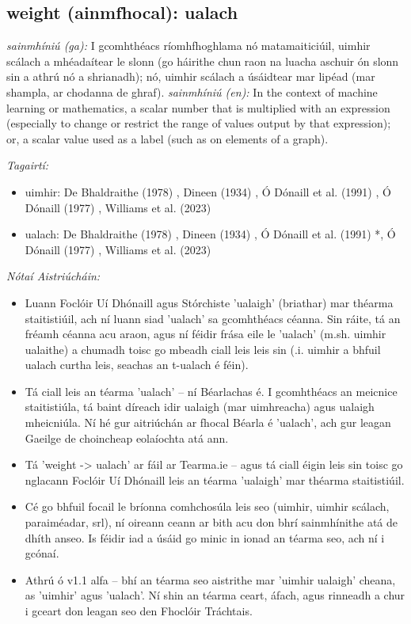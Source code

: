 \documentclass{article}
\begin{document}
\subsection*{weight (ainmfhocal): ualach} 
 \noindent \textit{sainmhíniú (ga):} I gcomhthéacs ríomhfhoghlama nó matamaiticiúil, uimhir scálach a mhéadaítear le slonn (go háirithe chun raon na luacha aschuir ón slonn sin a athrú nó a shrianadh); nó, uimhir scálach a úsáidtear mar lipéad (mar shampla, ar chodanna de ghraf).
\newline\newline
 \noindent \textit{sainmhíniú (en):} In the context of machine learning or mathematics, a scalar number that is multiplied with an expression (especially to change or restrict the range of values output by that expression); or, a scalar value used as a label (such as on elements of a graph).
\newline

 \noindent \textit{Tagairtí:}
\begin{itemize}
	\item uimhir: De Bhaldraithe (1978) \cite{de-bhaldraithe}, Dineen (1934) \cite{dineen}, Ó Dónaill et al. (1991) \cite{focloir-beag}, Ó Dónaill (1977) \cite{odonaill}, Williams et al. (2023) \cite{storchiste}
	\item ualach: De Bhaldraithe (1978) \cite{de-bhaldraithe}, Dineen (1934) \cite{dineen}, Ó Dónaill et al. (1991) \cite{focloir-beag}*, Ó Dónaill (1977) \cite{odonaill}, Williams et al. (2023) \cite{storchiste}
\end{itemize}

 \noindent \textit{Nótaí Aistriúcháin:}
\begin{itemize}
	\item Luann Foclóir Uí Dhónaill agus Stórchiste 'ualaigh' (briathar) mar théarma staitistiúil, ach ní luann siad 'ualach' sa gcomhthéacs céanna. Sin ráite, tá an fréamh céanna acu araon, agus ní féidir frása eile le 'ualach' (m.sh. uimhir ualaithe) a chumadh toisc go mbeadh ciall leis leis sin (.i. uimhir a bhfuil ualach curtha leis, seachas an t-ualach é féin).
	\item Tá ciall leis an téarma 'ualach' -- ní Béarlachas é. I gcomhthéacs an meicnice staitistiúla, tá baint díreach idir ualaigh (mar uimhreacha) agus ualaigh mheicniúla. Ní hé gur aitriúchán ar fhocal Béarla é 'ualach', ach gur leagan Gaeilge de choincheap eolaíochta atá ann.
	\item Tá 'weight -> ualach' ar fáil ar Tearma.ie -- agus tá ciall éigin leis sin toisc go nglacann Foclóir Uí Dhónaill leis an téarma 'ualaigh' mar théarma staitistiúil. 
	\item Cé go bhfuil focail le bríonna comhchosúla leis seo (uimhir, uimhir scálach, paraiméadar, srl), ní oireann ceann ar bith acu don bhrí sainmhínithe atá de dhíth anseo. Is féidir iad a úsáid go minic in ionad an téarma seo, ach ní i gcónaí.
	\item Athrú ó v1.1 alfa -- bhí an téarma seo aistrithe mar 'uimhir ualaigh' cheana, as 'uimhir' agus 'ualach'. Ní shin an téarma ceart, áfach, agus rinneadh a chur i gceart don leagan seo den Fhoclóir Tráchtais.
\end{itemize}
\end{document}
